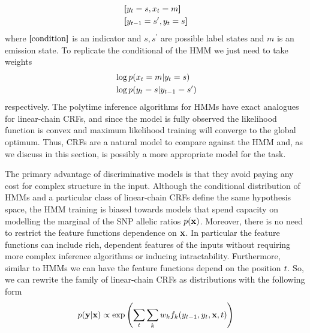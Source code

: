 \begin{align*}
&\bm{[}y_{t} = s, x_{t} = m\bm{]}\\
&\bm{[}y_{t-1} = s^{\prime} , y_{t} = s\bm{]}
\end{align*}
where $\bm{[}\text{condition}\bm{]}$ is an indicator and $s,s^{\prime}$ are possible label states and $m$ is an emission state. To replicate the conditional of the HMM we just need to take weights
\begin{align*}
&\log p(x_{t} = m | y_{t} = s)\\
&\log p( y_{t} = s | y_{t-1} = s^{\prime})
\end{align*}
respectively. The polytime inference algorithms for HMMs have exact analogues for linear-chain CRFs, and since the model is fully observed the likelihood function is convex and maximum likelihood training will converge to the global optimum. Thus, CRFs are a natural model to compare against the HMM and, as we discuss in this section, is possibly a more appropriate model for the task.

The primary advantage of discriminative models is that they avoid paying any cost for complex structure in the input. Although the conditional distribution of HMMs and a particular class of linear-chain CRFs define the same hypothesis space, the HMM training is biased towards models that spend capacity on modelling the marginal of the SNP allelic ratios $p(\mathbf{x})$. Moreover, there is no need to restrict the feature functions dependence on $\mathbf{x}$. In particular the feature functions can include rich, dependent features of the inputs without requiring more complex inference algorithms or inducing intractability. Furthermore, similar to HMMs we can have the feature functions depend on the position $t$. So, we can rewrite the family of linear-chain CRFs as distributions with the following form
\begin{align*}
p(\mathbf{y} | \mathbf{x}) \propto \exp\left( \sum_{t} \sum_{k} w_k f_{k}(y_{t-1}, y_{t}, \mathbf{x}, t)\right)
\end{align*}

